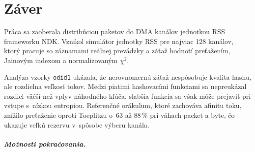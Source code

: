 \chapter{Záver}
\label{chap:zaver}

Práca sa zaoberala distribúciou paketov do DMA kanálov jednotkou RSS frameworku NDK. Vznikol
simulátor jednotky RSS pre najviac 128 kanálov, ktorý pracuje so záznamami reálnej prevádzky
a záťaž hodnotí preťažením, Jainovým indexom a normalizovaným $\chi^2$.

Analýza vzorky \texttt{odid1} ukázala, že nerovnomernú záťaž nespôsobuje kvalita hashu, ale
rozdielna veľkosť tokov. Medzi piatimi hashovacími funkciami sa nepreukázal rozdiel väčší než
vplyv náhodného kľúča, slabšia funkcia sa však môže prejaviť pri vstupe s~nízkou entropiou. Referenčné orákulum, ktoré zachováva afinitu toku, znížilo preťaženie
oproti Toeplitzu o~63 až 88\,\% pri váhach packet a byte, čo ukazuje veľkú rezervu v~spôsobe
výberu kanála.


\paragraph{Možnosti pokračovania.}
